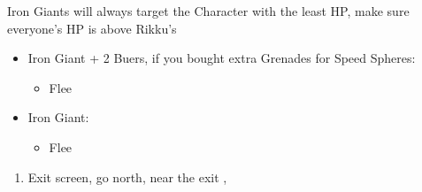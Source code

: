 \begin{encounters}
	Iron Giants will always target the Character with the least HP, make sure everyone's HP is above Rikku's
	\begin{itemize}
		\item Iron Giant + 2 Buers, if you bought extra Grenades for Speed Spheres:
			\begin{itemize}
				\switch{\tidus}{\rikku}
				\rikkuf Use Grenade
				\wakkaf Defend
				\auronf Defend
				\enemyf Attacks \rikku
				\switch{\wakka}{\tidus}
				\item Flee
			\end{itemize}
		\item Iron Giant:
			\begin{itemize}
				\tidusf Defend
				\switch{\wakka}{\rikku}
				\rikkuf Steal Light Curtain
				\auronf Defend
				\enemyf Attacks \rikku
				\item Flee
			\end{itemize}
	\end{itemize}
\end{encounters}
\begin{enumerate}[resume]
	\item Exit screen, go north, near the exit \sd, \cs[3:10]
\end{enumerate}